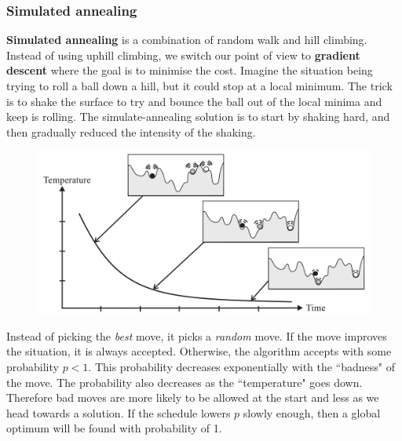 \documentclass{article}
\begin{document}
\subsubsection{Simulated annealing}
\textbf{Simulated annealing} is a combination of random walk and hill climbing. Instead of using uphill climbing, we switch our point of view to \textbf{gradient descent} where the goal is to minimise the cost. Imagine the situation being trying to roll a ball down a hill, but it could stop at a local minimum. The trick is to shake the surface to try and bounce the ball out of the local minima and keep is rolling. The simulate-annealing solution is to start by shaking hard, and then gradually reduced the intensity of the shaking.
\begin{figure}[H]
\centering
\includegraphics[width=1\textwidth, keepaspectratio]{imgs/simulated-annealing.jpeg}
\end{figure}
\noindent
Instead of picking the \textit{best} move, it picks a \textit{random} move. If the move improves the situation, it is always accepted. Otherwise, the algorithm accepts with some probability $p < 1$. This probability decreases exponentially with the ``badness" of the move. The probability also decreases as the ``temperature" goes down. Therefore bad moves are more likely to be allowed at the start and less as we head towards a solution. If the schedule lowers $p$ slowly enough, then a global optimum will be found with probability of 1.
\end{document}
